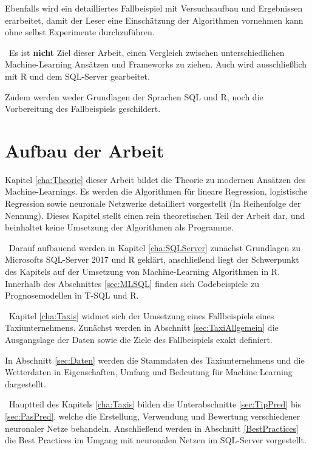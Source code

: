 Ebenfalls wird ein detailliertes Fallbeispiel mit Versuchsaufbau und Ergebnissen erarbeitet, damit der Leser eine Einschätzung der Algorithmen vornehmen kann ohne selbst Experimente durchzuführen.

~\newline Es ist \textbf{nicht} Ziel dieser Arbeit, einen Vergleich zwischen unterschiedlichen Machine-Learning Ansätzen und Frameworks zu ziehen. Auch wird ausschließlich mit R und dem SQL-Server gearbeitet. 

Zudem werden weder Grundlagen der Sprachen SQL und R, noch die Vorbereitung des Fallbeispiels geschildert.

\section{Aufbau der Arbeit}
Kapitel \ref{cha:Theorie} dieser Arbeit bildet die Theorie zu modernen Ansätzen des Machine-Learnings. Es werden die Algorithmen für lineare Regression, logistische Regression sowie neuronale Netzwerke detailliert vorgestellt (In Reihenfolge der Nennung). Dieses Kapitel stellt einen rein theoretischen Teil der Arbeit dar, und beinhaltet keine Umsetzung der Algorithmen als Programme.

~\newline Darauf aufbauend  werden in Kapitel \ref{cha:SQLServer} zunächst Grundlagen zu Microsofts SQL-Server 2017 und R geklärt, anschließend liegt der Schwerpunkt des Kapitels auf der Umsetzung von Machine-Learning Algorithmen in R. Innerhalb des Abschnittes \ref{sec:MLSQL} finden sich Codebeispiele zu Prognosemodellen in T-SQL und R.

~\newline Kapitel \ref{cha:Taxis} widmet sich der Umsetzung eines Fallbeispiels eines Taxiunternehmens. Zunächst werden in Abschnitt \ref{sec:TaxiAllgemein} die Ausgangslage der Daten sowie die Ziele des Fallbeispiels exakt definiert. 

In Abschnitt \ref{sec:Daten} werden die Stammdaten des Taxiunternehmens und die Wetterdaten in Eigenschaften, Umfang und Bedeutung für Machine Learning dargestellt. 

~\newline Hauptteil des Kapitels \ref{cha:Taxis} bilden die Unterabschnitte \ref{sec:TipPred} bis \ref{sec:PasPred}, welche die Erstellung, Verwendung und Bewertung verschiedener neuronaler Netze behandeln. Anschließend werden in Abschnitt \ref{BestPractices} die Best Practices im Umgang mit neuronalen Netzen im SQL-Server vorgestellt.


